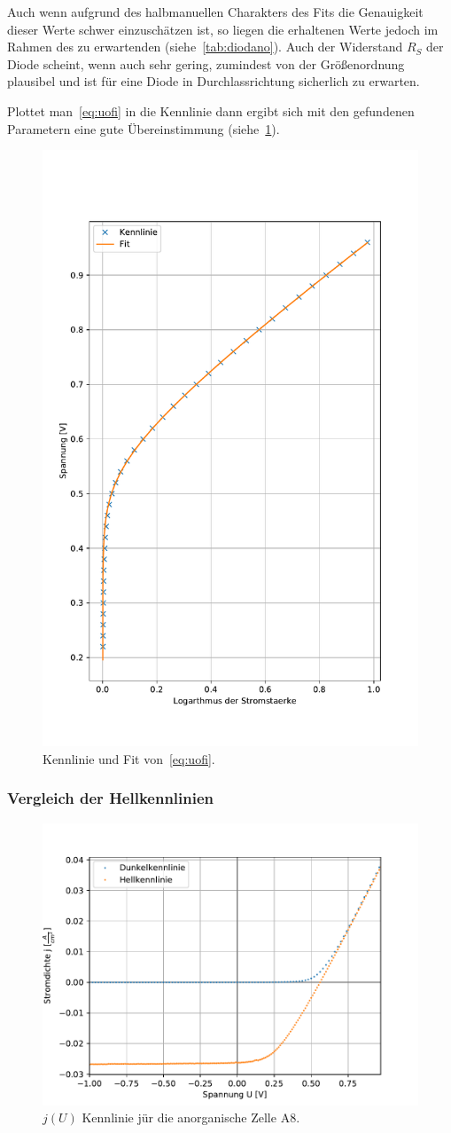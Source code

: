 \documentclass[slug=SZ, room=Hermann-Krone-Bau\,\ Labor\ 1.25, supervisor=Martin\ Kroll]{../../Lab_Report_LaTeX/lab_report}
\begin{document}
Auch wenn aufgrund des halbmanuellen Charakters des Fits die
Genauigkeit dieser Werte schwer einzusch\"atzen ist, so liegen die
erhaltenen Werte jedoch im Rahmen des zu erwartenden
(siehe~\ref{tab:diodano}). Auch der Widerstand \(R_S\) der Diode
scheint, wenn auch sehr gering, zumindest von der Gr\"o\ss{}enordnung
plausibel und ist f\"ur eine Diode in Durchlassrichtung sicherlich zu
erwarten.

Plottet man~\ref{eq:uofi} in die Kennlinie dann ergibt sich mit den
gefundenen Parametern eine gute \"Ubereinstimmung (siehe~\ref{fig:a-anorg-log}).


\begin{figure}[H]\centering
  \includegraphics[width=.5\columnwidth]{./figs/python/A/dark_an_fit_final.pdf}
  \caption{Kennlinie und Fit von~\ref{eq:uofi}.}
  \label{fig:a-anorg-log}
\end{figure}

\subsubsection{Vergleich der Hellkennlinien}
\label{sec:vglhell}

\begin{figure}[H]\centering
  \includegraphics[width=.7\columnwidth]{./figs/python/A/anorg_combined.pdf}
  \caption{\(j(U)\) Kennlinie j\"ur die anorganische Zelle A8.}
  \label{fig:a-anorg-combined}
\end{figure}
\end{document}
